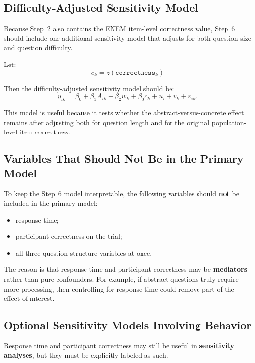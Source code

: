 \documentclass[11pt]{article}
\begin{document}
\subsection{Difficulty-Adjusted Sensitivity Model}
Because Step~2 also contains the ENEM item-level correctness value, Step~6 should include one
additional sensitivity model that adjusts for both question size and question difficulty.

Let:
\begin{equation}
c_k = z(\texttt{correctness}_k)
\end{equation}

Then the difficulty-adjusted sensitivity model should be:
\begin{equation}
y_{ik}
=
\beta_0
+
\beta_1 A_{ik}
+
\beta_2 w_k
+
\beta_3 c_k
+
u_i
+
v_k
+
\varepsilon_{ik}.
\end{equation}

This model is useful because it tests whether the abstract-versus-concrete effect remains after
adjusting both for question length and for the original population-level item correctness.

\subsection{Variables That Should Not Be in the Primary Model}
To keep the Step~6 model interpretable, the following variables should \textbf{not} be included
in the primary model:
\begin{itemize}
    \item response time;
    \item participant correctness on the trial;
    \item all three question-structure variables at once.
\end{itemize}

The reason is that response time and participant correctness may be \textbf{mediators} rather than pure confounders.
For example, if abstract questions truly require more processing, then controlling for response time
could remove part of the effect of interest.

\subsection{Optional Sensitivity Models Involving Behavior}
Response time and participant correctness may still be useful in \textbf{sensitivity analyses}, but they
must be explicitly labeled as such.
\end{document}
